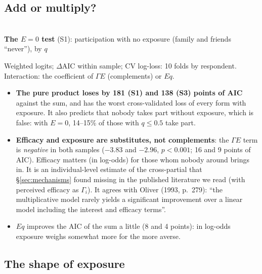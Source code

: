 \documentclass[11pt,a4paper]{article}
\begin{document}
\subsection{Add or multiply?}
\label{sec:rule-forms}

\begin{center}
\small
\\[6pt]
\textbf{The $E = 0$ test} (S1): participation with no exposure (family and friends ``never''), by $q$\\[2pt]

\end{center}
\noindent Weighted logits; $\Delta$AIC within sample; CV log-loss: 10 folds by respondent. Interaction: the
coefficient of $\Gamma E$ (complements) or $E q$.
\begin{itemize}
  \item \textbf{The pure product loses by 181 (S1) and 138 (S3) points of AIC} against the sum, and has the
    worst cross-validated loss of every form with exposure. It also predicts that nobody takes part without
    exposure, which is false: with $E = 0$, 14--15\% of those with $q \le 0.5$ take part.
  \item \textbf{Efficacy and exposure are substitutes, not complements}: the $\Gamma E$ term is
    \emph{negative} in both samples ($-3.83$ and $-2.96$, $p < 0.001$; 16 and 9 points of AIC). Efficacy
    matters (in log-odds) for those whom nobody around brings in. It is an individual-level estimate of the
    cross-partial that \S\ref{sec:mechanisms} found missing in the published literature we read (with
    perceived efficacy as $\Gamma_i$). It agrees with Oliver (1993, p.~279): ``the multiplicative model rarely yields a significant
    improvement over a linear model including the interest and efficacy terms''.
  \item $E q$ improves the AIC of the sum a little (8 and 4 points): in log-odds exposure weighs somewhat more for the
    more averse.
\end{itemize}

\subsection{The shape of exposure}
\label{sec:rule-shape}
\end{document}
